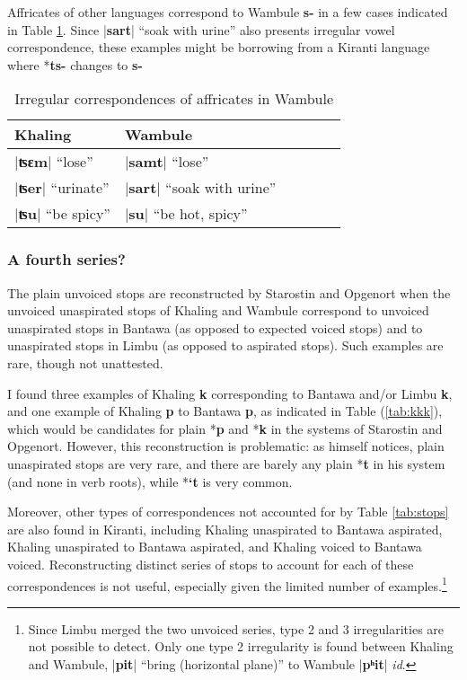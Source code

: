 \documentclass[oldfontcommands,oneside,a4paper,11pt]{article}
\newcommand{\ipa}[1]{\textbf{{\phon\mbox{#1}}}} %
\newcommand{\dhatu}[2]{|\ipa{#1}| ``#2''}
\begin{document}
Affricates of other languages correspond to Wambule \ipa{s-} in a few cases indicated in Table \ref{tab:affricates.wambule}. Since \dhatu{sart}{soak with urine} also presents irregular vowel correspondence, these examples might  be borrowing from a Kiranti language where *\ipa{ts-} changes to \ipa{s-}

\begin{table}[H]
\caption{Irregular correspondences of affricates in Wambule} \centering \label{tab:affricates.wambule}
\begin{tabular}{llllll}
\toprule
Khaling & Wambule \\
\midrule
\dhatu{ʦɛm}{lose} & \dhatu{samt}{lose}\\
\dhatu{ʦer}{urinate} & \dhatu{sart}{soak with urine} \\
\dhatu{ʦu}{be spicy} & \dhatu{su}{be hot, spicy}\\
\bottomrule
\end{tabular}
\end{table}


\subsubsection{A fourth series?} \label{sec:fourth}
The plain unvoiced stops are reconstructed by Starostin and Opgenort  when the unvoiced unaspirated stops of Khaling and Wambule correspond to unvoiced unaspirated stops in Bantawa (as opposed to expected voiced stops) and to unaspirated stops in Limbu (as opposed to aspirated stops). Such examples are rare, though not unattested. 

I found three examples of Khaling \ipa{k} corresponding to Bantawa and/or Limbu \ipa{k}, and one example of Khaling \ipa{p} to Bantawa \ipa{p}, as indicated in Table (\ref{tab:kkk}), which would be candidates for plain *\ipa{p} and *\ipa{k} in the systems of Starostin and Opgenort. However, this reconstruction is problematic: as \citet[17]{opgenort05jero} himself notices, plain unaspirated stops are very rare, and there are barely any plain *\ipa{t} in his system (and none in verb roots), while *\ipa{`t} is very common.  

Moreover, other types of correspondences not accounted for by Table \ref{tab:stops} are also found in Kiranti, including Khaling  unaspirated to Bantawa aspirated, Khaling unaspirated to Bantawa aspirated, and Khaling voiced to Bantawa voiced. Reconstructing distinct series of stops to account for each of these correspondences is not useful, especially given the limited number of examples.\footnote{Since Limbu merged the two unvoiced series, type 2 and 3 irregularities are not possible to detect. Only one type 2 irregularity is found between Khaling and Wambule, \dhatu{pit}{bring (horizontal plane)} to Wambule |\ipa{pʰit}| \textit{id}.}
\end{document}
